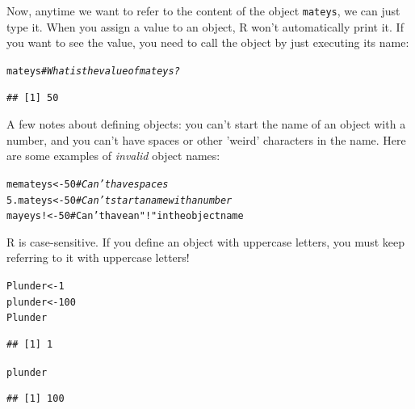 \documentclass{tufte-book}\usepackage[]{graphicx}\usepackage[]{color}
\makeatletter
\newcommand{\hlnum}[1]{\textcolor[rgb]{0.686,0.059,0.569}{#1}}%
\newcommand{\hlstr}[1]{\textcolor[rgb]{0.192,0.494,0.8}{#1}}%
\newcommand{\hlcom}[1]{\textcolor[rgb]{0.678,0.584,0.686}{\textit{#1}}}%
\newcommand{\hlstd}[1]{\textcolor[rgb]{0.345,0.345,0.345}{#1}}%
\newcommand{\hlkwb}[1]{\textcolor[rgb]{0.69,0.353,0.396}{#1}}%
\newenvironment{kframe}{%
 \def\at@end@of@kframe{}%
 \ifinner\ifhmode%
  \def\at@end@of@kframe{\end{minipage}}%
  \begin{minipage}{\columnwidth}%
 \fi\fi%
 \def\FrameCommand##1{\hskip\@totalleftmargin \hskip-\fboxsep
 \colorbox{shadecolor}{##1}\hskip-\fboxsep
     \hskip-\linewidth \hskip-\@totalleftmargin \hskip\columnwidth}%
 \MakeFramed {\advance\hsize-\width
   \@totalleftmargin\z@ \linewidth\hsize
   \@setminipage}}%
 {\par\unskip\endMakeFramed%
 \at@end@of@kframe}
\newenvironment{knitrout}{}{} %
\makeatother
\begin{document}
Now, anytime we want to refer to the content of the object \texttt{mateys}, we can just type it. When you assign a value to an object, R won't automatically print it. If you want to see the value, you need to call the object by just executing its name:


\begin{knitrout}
\color{fgcolor}\begin{kframe}
\begin{alltt}
\hlstd{mateys} \hlcom{# What is the value of mateys?}
\end{alltt}
\begin{verbatim}
## [1] 50
\end{verbatim}
\end{kframe}
\end{knitrout}


A few notes about defining objects: you can't start the name of an object with a number, and you can't have spaces or other 'weird' characters in the name. Here are some examples of \textit{invalid} object names:


\begin{knitrout}
\color{fgcolor}\begin{kframe}
\begin{alltt}
me mateys <- 50 \hlcom{# Can't have spaces}
5.mateys <- 50 \hlcom{# Can't start a name with a number}
mayeys! <- 5 0# Can't have an \hlstr{"!"} in the object name
\end{alltt}
\end{kframe}
\end{knitrout}


R is case-sensitive. If you define an object with uppercase letters, you must keep referring to it with uppercase letters!



\begin{knitrout}
\color{fgcolor}\begin{kframe}
\begin{alltt}
\hlstd{Plunder} \hlkwb{<-} \hlnum{1}
\hlstd{plunder} \hlkwb{<-} \hlnum{100}
\hlstd{Plunder}
\end{alltt}
\begin{verbatim}
## [1] 1
\end{verbatim}
\begin{alltt}
\hlstd{plunder}
\end{alltt}
\begin{verbatim}
## [1] 100
\end{verbatim}
\end{kframe}
\end{knitrout}
\end{document}
